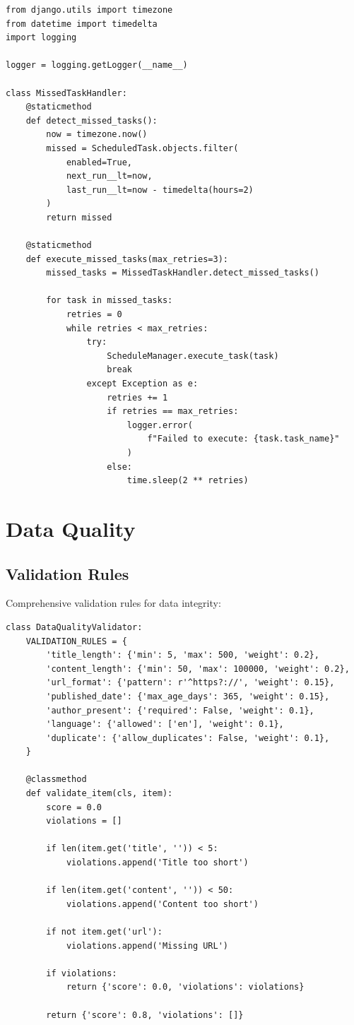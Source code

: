 \documentclass[12pt,a4paper]{report}
\begin{document}
\begin{lstlisting}
from django.utils import timezone
from datetime import timedelta
import logging

logger = logging.getLogger(__name__)

class MissedTaskHandler:
    @staticmethod
    def detect_missed_tasks():
        now = timezone.now()
        missed = ScheduledTask.objects.filter(
            enabled=True,
            next_run__lt=now,
            last_run__lt=now - timedelta(hours=2)
        )
        return missed
    
    @staticmethod
    def execute_missed_tasks(max_retries=3):
        missed_tasks = MissedTaskHandler.detect_missed_tasks()
        
        for task in missed_tasks:
            retries = 0
            while retries < max_retries:
                try:
                    ScheduleManager.execute_task(task)
                    break
                except Exception as e:
                    retries += 1
                    if retries == max_retries:
                        logger.error(
                            f"Failed to execute: {task.task_name}"
                        )
                    else:
                        time.sleep(2 ** retries)
\end{lstlisting}

\chapter{Data Quality}

\section{Validation Rules}

Comprehensive validation rules for data integrity:

\begin{lstlisting}
class DataQualityValidator:
    VALIDATION_RULES = {
        'title_length': {'min': 5, 'max': 500, 'weight': 0.2},
        'content_length': {'min': 50, 'max': 100000, 'weight': 0.2},
        'url_format': {'pattern': r'^https?://', 'weight': 0.15},
        'published_date': {'max_age_days': 365, 'weight': 0.15},
        'author_present': {'required': False, 'weight': 0.1},
        'language': {'allowed': ['en'], 'weight': 0.1},
        'duplicate': {'allow_duplicates': False, 'weight': 0.1},
    }
    
    @classmethod
    def validate_item(cls, item):
        score = 0.0
        violations = []
        
        if len(item.get('title', '')) < 5:
            violations.append('Title too short')
        
        if len(item.get('content', '')) < 50:
            violations.append('Content too short')
        
        if not item.get('url'):
            violations.append('Missing URL')
        
        if violations:
            return {'score': 0.0, 'violations': violations}
        
        return {'score': 0.8, 'violations': []}
\end{lstlisting}
\end{document}
